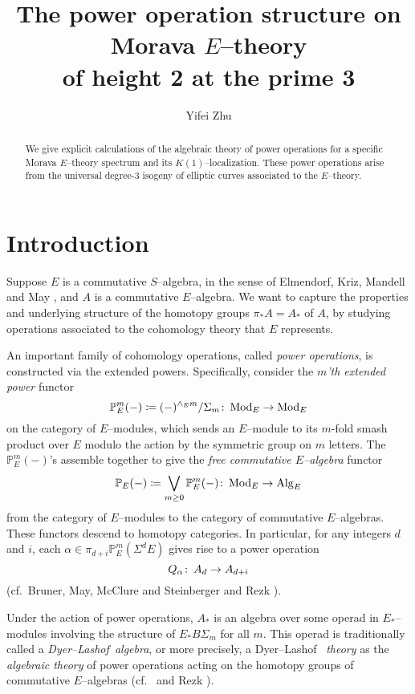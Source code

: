 \documentclass[microtype]{gtpart}     %
\title{The power operation structure on Morava $E$--theory\\of height 2 at the prime 3}
\author{Yifei Zhu}
\theoremstyle{remark}
\theoremstyle{definition}
\def\co{\colon\thinspace}
\newcommand{\mb}[1]{\mathbb{#1}}
\newcommand{\Mod}{{\rm Mod}}
\newcommand{\Alg}{{\rm Alg}}
\newcommand{\DL}{Dyer--Lashof~}
\newcommand{\BP}{{\mb P}}
\newcommand{\ce}{\coloneqq}
\newcommand{\A}{\alpha}
\begin{document}
\begin{abstract}    %
 We give explicit calculations of the algebraic theory of power operations 
 for a specific Morava $E$--theory spectrum and its $K(1)$--localization.  
 These power operations arise from the universal degree-3 isogeny of 
 elliptic curves associated to the $E$--theory.  
\end{abstract}

\maketitle


\section{Introduction}

Suppose $E$ is a commutative $S$--algebra, in the sense of Elmendorf, Kriz, 
Mandell and May \cite{EKMM}, and $A$ is a commutative $E$--algebra.  We want 
to capture the properties and underlying structure of the homotopy groups 
$\pi_* A = A_*$ of $A$, by studying operations associated to the cohomology 
theory that $E$ represents.  

An important family of cohomology operations, called {\em power operations}, 
is constructed via the extended powers.  Specifically, consider the 
{\em $m$'th extended power} functor 
\[
 \BP_E^m (-) \ce (-)^{\wedge_E m} / \Sigma_m \co \Mod_E \to \Mod_E 
\]
on the category of $E$--modules, which sends an $E$--module to its $m$-fold 
smash product over $E$ modulo the action by the symmetric group on $m$ 
letters.  The $\BP_E^m (-)$'s assemble together to give the {\em free 
commutative $E$--algebra} functor 
\[
 \BP_E (-) \ce \bigvee_{m \geq 0} \BP_E^m (-) \co \Mod_E \to \Alg_E 
\]
from the category of $E$--modules to the category of commutative 
$E$--algebras.  These functors descend to homotopy categories.  In 
particular, for any integers $d$ and $i$, each 
$\A \in \pi_{d+i} \BP_E^m (\Sigma^d E)$ gives rise to a power operation 
\[
 Q_\A \co A_d \to A_{d+i} 
\]
(cf.~Bruner, May, McClure and Steinberger 
\cite[Sections I.2 and IX.1]{H_infty} and Rezk \cite[Section 3]{cong}).  

Under the action of power operations, $A_*$ is an algebra over some operad in 
$E_*$--modules involving the structure of $E_* B\Sigma_m$ for all $m$.  This 
operad is traditionally called a {\em \DL algebra}, or more precisely, a \DL 
{\em theory} as the {\em algebraic theory} of power operations acting on the 
homotopy groups of commutative $E$--algebras 
(cf.~\cite[Chapters III, VIII and IX]{H_infty} and Rezk 
\cite[Section 9]{lpo}).  
\end{document}
